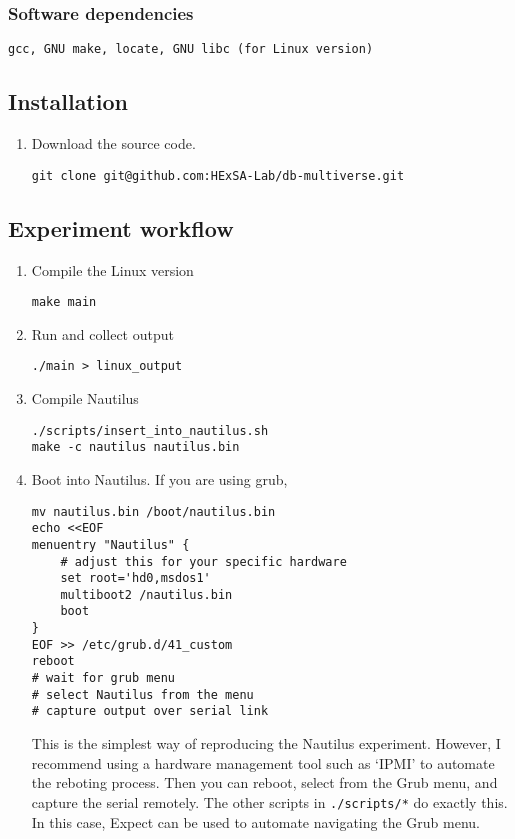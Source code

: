 \documentclass{IEEEtran}
\begin{document}
\subsubsection{Software dependencies}

\texttt{gcc, GNU make, locate, GNU libc (for Linux version)}

\subsection{Installation}

\begin{enumerate}
\item Download the source code.

\begin{verbatim}
git clone git@github.com:HExSA-Lab/db-multiverse.git
\end{verbatim}
\end{enumerate}

\subsection{Experiment workflow}

\begin{enumerate}
  \item Compile the Linux version
\begin{verbatim}
make main
\end{verbatim}

  \item Run and collect output
\begin{verbatim}
./main > linux_output
\end{verbatim}

  \item Compile Nautilus
\begin{verbatim}
./scripts/insert_into_nautilus.sh
make -c nautilus nautilus.bin
\end{verbatim}

  \item Boot into Nautilus. If you are using grub, 
\begin{verbatim}
mv nautilus.bin /boot/nautilus.bin
echo <<EOF
menuentry "Nautilus" {
    # adjust this for your specific hardware
    set root='hd0,msdos1'
    multiboot2 /nautilus.bin
    boot
}
EOF >> /etc/grub.d/41_custom
reboot
# wait for grub menu
# select Nautilus from the menu
# capture output over serial link
\end{verbatim}

This is the simplest way of reproducing the Nautilus experiment. However, I recommend using a hardware management tool such as `IPMI' to automate the reboting process. Then you can reboot, select from the Grub menu, and capture the serial remotely. The other scripts in \texttt{./scripts/*} do exactly this. In this case, Expect can be used to automate navigating the Grub menu.

\end{enumerate}
\end{document}

